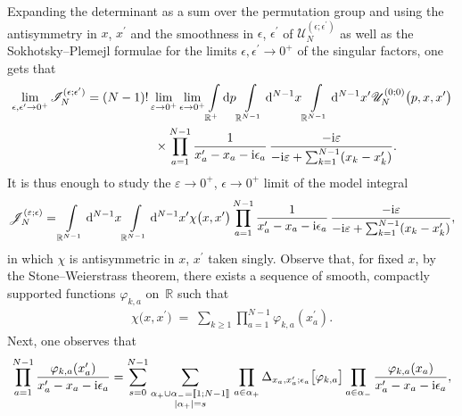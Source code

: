 Expanding the determinant as a sum over the permutation group and using the antisymmetry in $x$, $x^{\prime}$ and the smoothness in
$\epsilon$, $\epsilon^{\prime}$ of $\mathscr{U}_N^{(\epsilon;\epsilon^{\prime})}$ as well as the Sokhotsky--Plemejl formulae for the limits
$\epsilon, \epsilon^{\prime} \rightarrow 0^+$ of the singular factors, one gets that
\begin{gather*}
\lim_{ \epsilon,\epsilon^{\prime}\rightarrow 0^+ } \mathscr{I}_N^{(\epsilon;\epsilon^{\prime})} =
 (N-1)! \lim_{\varepsilon\rightarrow 0^+} \lim_{ \epsilon \rightarrow 0^+ }
\int\limits_{\mathbb{R}^+}{} {\rm d}p \int\limits_{\mathbb{R}^{N-1}}{} {\rm d}^{N-1}x
\int\limits_{\mathbb{R}^{N-1}}{} {\rm d}^{N-1}x^{\prime} \mathscr{U}_N^{(0;0)}\big(p,x,x^{\prime} \big)
\\ \hphantom{\lim_{ \epsilon,\epsilon^{\prime}\rightarrow 0^+ } \mathscr{I}_N^{(\epsilon;\epsilon^{\prime})} =}
\times \prod\limits_{a=1}^{N-1} \frac{ 1 }{ x^{\prime}_a - x_a -{\rm i} \epsilon_a } \,\frac{-{\rm i} \varepsilon }{
 -{\rm i} \varepsilon + \sum_{k=1}^{N-1}(x_k - x_k^{\prime}) }.
\end{gather*}
It is thus enough to study the $\varepsilon\rightarrow 0^+$, $\epsilon \rightarrow 0^+ $ limit of the model integral
\begin{gather*}
\mathscr{J}_N^{(\varepsilon;\epsilon)} = \int\limits_{\mathbb{R}^{N-1}}{} {\rm d}^{N-1}x
\int\limits_{\mathbb{R}^{N-1}}{} {\rm d}^{N-1}x^{\prime} \chi\big(x,x^{\prime} \big)
 \prod\limits_{a=1}^{N-1} \frac{1}{x^{\prime}_a-x_a-{\rm i} \epsilon_a }
\, \frac{-{\rm i} \varepsilon }{-{\rm i} \varepsilon + \sum_{k=1}^{N-1}(x_k - x_k^{\prime}) },
\end{gather*}
in which $\chi$ is antisymmetric in $x$, $x^{\prime}$ taken singly. Observe that, for fixed $x$, by the Stone--Weierstrass theorem, there
exists a sequence of smooth, compactly supported functions $\varphi_{k,a}$ on~$\mathbb{R}$ such that
\begin{gather*}
 \chi\big(x,x^{\prime} \big) \; = \; \sum_{k\geq 1 }{} \prod\limits_{a=1}^{N-1}\varphi_{k,a}(x_a^{\prime}).
\end{gather*}
Next, one observes that
\begin{gather*}
\prod\limits_{a=1}^{N-1} \frac{ \varphi_{k,a}(x_a^{\prime}) }{x^{\prime}_a-x_a-{\rm i} \epsilon_a }
 = \sum_{s=0}^{N-1} \sum\limits_{ \substack{ \alpha_+\cup \alpha_- = [\![1;N-1]\!] \\ |\alpha_+|=s } }{}
\prod\limits_{a \in \alpha_+}{} \Delta_{x_a,x_a^{\prime}; \epsilon_a}\big[ \varphi_{k,a}\big] \prod\limits_{a \in \alpha_-}{}
\frac{ \varphi_{k,a}(x_a ) }{x^{\prime}_a-x_a-{\rm i} \epsilon_a },
\end{gather*}
